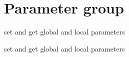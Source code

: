 \hypertarget{group__parameters}{
\section{\-Parameter group}
\label{group__parameters}
}


set and get global and local parameters  


set and get global and local parameters 